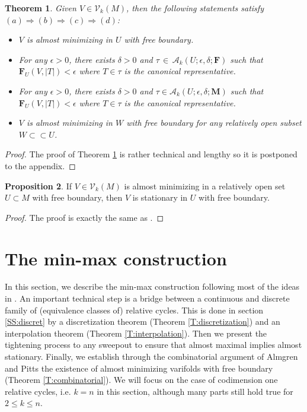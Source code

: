 \documentclass[10pt]{amsart}
\newtheorem{theorem}{Theorem}[section]
\theoremstyle{definition}
\newtheorem{proposition}[theorem]{Proposition}
\theoremstyle{remark}
\numberwithin{equation}{section}
\newcommand{\V}{\mathcal{V}}
\newcommand{\de}{\delta}
\newcommand{\ep}{\epsilon}
\newcommand{\M}{\mathbf{M}}
\newcommand{\mF}{\mathbf{F}}
\newcommand{\sA}{\mathscr{A}}
\begin{document}
\begin{theorem}
\label{T:def-equiv}
Given $V\in \V_k(M)$, then the following statements satisfy $(a)\Longrightarrow (b)\Longrightarrow (c)\Longrightarrow (d)$:
\begin{itemize}
\item[$(a)$]  $V$ is almost minimizing in $U$ with free boundary.
\item[$(b)$]  For any $\ep>0$, there exists $\de>0$ and $\tau \, \in \, \sA_k(U; \ep, \de; \mF)$ such that $\mF_U(V, |T|)<\ep$ where $T \in \tau$ is the canonical representative.
\item[$(c)$]  For any $\ep>0$, there exists $\de>0$ and $\tau\in \sA_k(U; \ep, \de; \M)$ such that $\mF_U(V, |T|)<\ep$ where $T \in \tau$ is the canonical representative.
\item[$(d)$] $V$ is almost minimizing in $W$ with free boundary for any relatively open subset $W \subset \subset U$.
\end{itemize}
\end{theorem}

\begin{proof}
The proof of Theorem \ref{T:def-equiv} is rather technical and lengthy so it is postponed to the appendix.
\end{proof}

\begin{proposition}
\label{P:stability-am}
If $V \in \V_k(M)$ is almost minimizing in a relatively open set $U \subset M$ with free boundary, then $V$ is stationary in $U$ with free boundary.
\end{proposition}

\begin{proof}
The proof is exactly the same as \cite[Theorem 3.3]{Pitts}.
\end{proof}




\section{The min-max construction}
\label{S:min-max}

In this section, we describe the min-max construction following most of the ideas in \cite{Pitts}. An important technical step is a bridge between a continuous and discrete family of (equivalence classes of) relative cycles. This is done in section \ref{SS:discret} by a discretization theorem (Theorem \ref{T:discretization}) and an interpolation theorem (Theorem \ref{T:interpolation}). Then we present the tightening process to any sweepout to ensure that almost maximal implies almost stationary. 
Finally, we establish through the combinatorial argument of Almgren and Pitts the existence of almost minimizing varifolds with free boundary (Theorem \ref{T:combinatorial}). We will focus on the case of codimension one relative cycles, i.e. $k=n$ in this section, although many parts still hold true for $2\leq k\leq n$.
\end{document}
